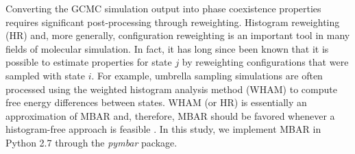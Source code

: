 \documentclass[journal=jced,manuscript=article]{achemso}
\begin{document}
%




Converting the GCMC simulation output into phase coexistence properties requires significant post-processing through reweighting. Histogram reweighting (HR) and, more generally, configuration reweighting is an important tool in many fields of molecular simulation. In fact, it has long since been known that it is possible to estimate properties for state $j$ by reweighting configurations that were sampled with state $i$. \cite{McDonald1967,Card1970,Wood1968,Pana2000} For example, umbrella sampling simulations are often processed using the weighted histogram analysis method (WHAM) to compute free energy differences between states. WHAM (or HR) is essentially an approximation of MBAR and, therefore, MBAR should be favored whenever a histogram-free approach is feasible \cite{Matos2017}. In this study, we implement MBAR in Python 2.7 through the \textit{pymbar} package. 
\end{document}
